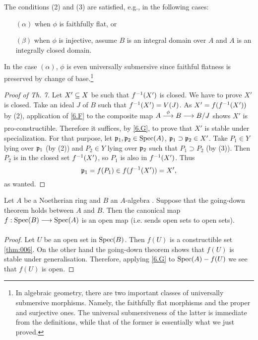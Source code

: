 \documentclass[../main]{subfiles}
\begin{document}
\begin{remark}\label{rem:06.02} The conditions (2) and (3) are satisfied, e.g., in the following cases:
\begin{itemize}
    \item[$(\alpha)$] when $\phi$ is faithfully flat, or
    \item[$(\beta)$] when $\phi$ is injective, assume $B$ is an integral domain over $A$ and $A$ is an integrally closed domain. 
\end{itemize}
In the case $(\alpha)$, $\phi$ is even universally submersive since faithful flatness is preserved by change of base.\footnote[1]{In algebraic geometry, there are two important classes of universally submersive morphisms. Namely, the faithfully flat morphisms and the proper and surjective ones. The universal submersiveness of the latter is immediate from the definitions, while that of the former is essentially what we just proved.}
\end{remark}
\begin{proof}[Proof of Th. 7]
Let $X' \subseteq X$ be such that $f^{-1}(X')$ is closed. We have to prove $X'$ is closed. Take an ideal $J$ of $B$ such that $f^{-1}(X') = V(J)$. As $X' = f(f^{-1}(X'))$ by (2), application of \ref{6.F} to the composite map $A \varrightarrow{\phi} B \varrightarrow{} B/J$ shows $X'$ is pro-constructible. Therefore it suffices, by \ref{6.G}, to prove that $X'$ is stable under specialization. For that purpose, let $\mathfrak{p}_1, \mathfrak{p}_2 \in \operatorname{Spec}(A)$, $\mathfrak{p}_1 \supset \mathfrak{p}_2 \in X'$. Take $P_1 \in Y$ lying over $\mathfrak{p}_1$ (by (2)) and $P_2 \in Y$ lying over $\mathfrak{p}_2$ such that $P_1 \supset P_2$ (by (3)). Then $P_2$ is in the closed set $f^{-1}(X')$, so $P_1$ is also in $f^{-1}(X')$. Thus \[\mathfrak{p}_1 = f(P_1) \in f(f^{-1}(X')) = X',\] as wanted.
\end{proof}

\begin{partheorem} \label{thm:008}
Let $A$ be a Noetherian ring and $B$ an $A$-algebra . Suppose that the going-down theorem holds between $A$ and $B$. Then the canonical map $f: \Spec(B) \varrightarrow{} \Spec(A)$ is an open map (i.e. sends open sets to open sets).
\end{partheorem}

\begin{proof}
Let $U$ be an open set in $\operatorname{Spec}(B)$. Then $f(U)$ is a constructible set \ref{thm:006}. On the other hand the going-down theorem shows that $f(U)$ is stable under generalisation. Therefore, applying \ref{6.G} to $\operatorname{Spec}(A) - f(U)$ we see that $f(U)$ is open.
\end{proof}
\end{document}
